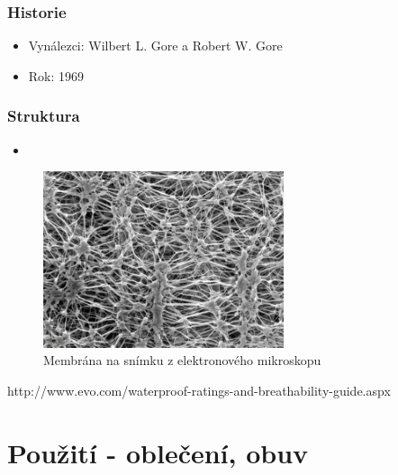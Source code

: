 \documentclass{beamer}
\newcommand{\zdroj}[1]{\textcolor{ExecusharesGrey}{\footnotesize\hspace{1em} #1}}
\begin{document}
		\begin{frame}
		  \frametitle{Historie}
		  \begin{itemize}
		    \item Vynálezci: Wilbert L. Gore a Robert W. Gore 
		    \item Rok: 1969
		  \end{itemize}
		\end{frame}
		
		\begin{frame}
		  \frametitle{Struktura}
		  \begin{itemize}
		    \item 
		  \end{itemize}
		  \begin{figure}
		    \begin{center}
		      \includegraphics[width=200pt]{membrane_microscopy_small.jpg}
		      \caption{Membrána na snímku z elektronového mikroskopu}
		      \label{fig:membrana}
		    \end{center}
		  \end{figure}
		  \zdroj{http://www.evo.com/waterproof-ratings-and-breathability-guide.aspx}
		\end{frame}
		
	\section{Použití - oblečení, obuv}
\end{document}
